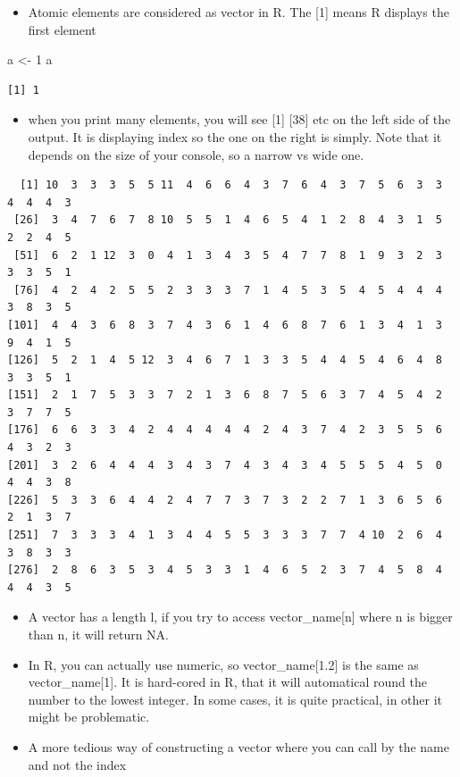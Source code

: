 \documentclass[
  letterpaper,
  DIV=11,
  numbers=noendperiod]{scrreprt}
\newenvironment{Shaded}{\begin{snugshade}}{\end{snugshade}}
\newcommand{\DecValTok}[1]{\textcolor[rgb]{0.68,0.00,0.00}{#1}}
\newcommand{\NormalTok}[1]{\textcolor[rgb]{0.00,0.23,0.31}{#1}}
\newcommand{\OtherTok}[1]{\textcolor[rgb]{0.00,0.23,0.31}{#1}}
\providecommand{\tightlist}{%
  \setlength{\itemsep}{0pt}\setlength{\parskip}{0pt}}
\begin{document}
\begin{itemize}
\tightlist
\item
  Atomic elements are considered as vector in R. The {[}1{]} means R
  displays the first element
\end{itemize}

\begin{Shaded}
\begin{Highlighting}[]
\NormalTok{a }\OtherTok{\textless{}{-}} \DecValTok{1}
\NormalTok{a}
\end{Highlighting}
\end{Shaded}

\begin{verbatim}
[1] 1
\end{verbatim}

\begin{itemize}
\tightlist
\item
  when you print many elements, you will see {[}1{]} {[}38{]} etc on the
  left side of the output. It is displaying index so the one on the
  right is simply. Note that it depends on the size of your console, so
  a narrow vs wide one.
\end{itemize}

\begin{verbatim}
  [1] 10  3  3  3  5  5 11  4  6  6  4  3  7  6  4  3  7  5  6  3  3  4  4  4  3
 [26]  3  4  7  6  7  8 10  5  5  1  4  6  5  4  1  2  8  4  3  1  5  2  2  4  5
 [51]  6  2  1 12  3  0  4  1  3  4  3  5  4  7  7  8  1  9  3  2  3  3  3  5  1
 [76]  4  2  4  2  5  5  2  3  3  3  7  1  4  5  3  5  4  5  4  4  4  3  8  3  5
[101]  4  4  3  6  8  3  7  4  3  6  1  4  6  8  7  6  1  3  4  1  3  9  4  1  5
[126]  5  2  1  4  5 12  3  4  6  7  1  3  3  5  4  4  5  4  6  4  8  3  3  5  1
[151]  2  1  7  5  3  3  7  2  1  3  6  8  7  5  6  3  7  4  5  4  2  3  7  7  5
[176]  6  6  3  3  4  2  4  4  4  4  4  2  4  3  7  4  2  3  5  5  6  4  3  2  3
[201]  3  2  6  4  4  4  3  4  3  7  4  3  4  3  4  5  5  5  4  5  0  4  4  3  8
[226]  5  3  3  6  4  4  2  4  7  7  3  7  3  2  2  7  1  3  6  5  6  2  1  3  7
[251]  7  3  3  3  4  1  3  4  4  5  5  3  3  3  7  7  4 10  2  6  4  3  8  3  3
[276]  2  8  6  3  5  3  4  5  3  3  1  4  6  5  2  3  7  4  5  8  4  4  4  3  5
\end{verbatim}

\begin{itemize}
\tightlist
\item
  A vector has a length l, if you try to access vector\_name{[}n{]}
  where n is bigger than n, it will return NA.
\item
  In R, you can actually use numeric, so vector\_name{[}1.2{]} is the
  same as vector\_name{[}1{]}. It is hard-cored in R, that it will
  automatical round the number to the lowest integer. In some cases, it
  is quite practical, in other it might be problematic.
\item
  A more tedious way of constructing a vector where you can call by the
  name and not the index
\end{itemize}
\end{document}
